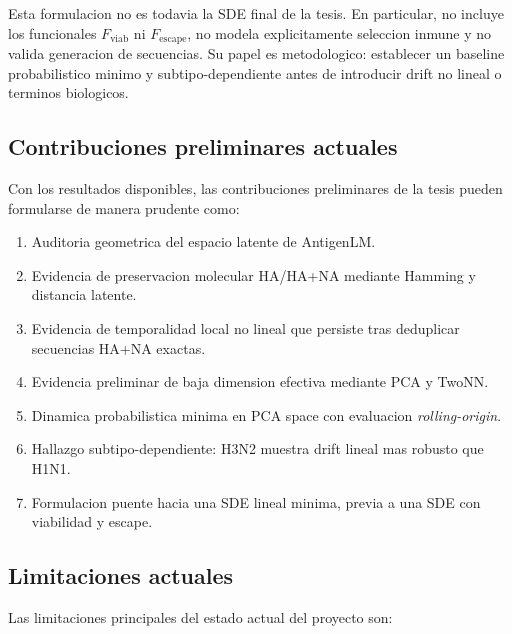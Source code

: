 \documentclass[12pt,letterpaper]{article}
\newcommand{\Fviab}{F_{\mathrm{viab}}}
\newcommand{\Fescape}{F_{\mathrm{escape}}}
\begin{document}
Esta formulacion no es todavia la SDE final de la tesis. En particular, no incluye los funcionales $\Fviab$ ni $\Fescape$, no modela explicitamente seleccion inmune y no valida generacion de secuencias. Su papel es metodologico: establecer un baseline probabilistico minimo y subtipo-dependiente antes de introducir drift no lineal o terminos biologicos.

\subsection{Contribuciones preliminares actuales}

Con los resultados disponibles, las contribuciones preliminares de la tesis pueden formularse de manera prudente como:

\begin{enumerate}[label=\textbf{C\arabic*.}, leftmargin=2.4em]
    \item Auditoria geometrica del espacio latente de AntigenLM.
    \item Evidencia de preservacion molecular HA/HA+NA mediante Hamming y distancia latente.
    \item Evidencia de temporalidad local no lineal que persiste tras deduplicar secuencias HA+NA exactas.
    \item Evidencia preliminar de baja dimension efectiva mediante PCA y TwoNN.
    \item Dinamica probabilistica minima en PCA space con evaluacion \emph{rolling-origin}.
    \item Hallazgo subtipo-dependiente: H3N2 muestra drift lineal mas robusto que H1N1.
    \item Formulacion puente hacia una SDE lineal minima, previa a una SDE con viabilidad y escape.
\end{enumerate}

\subsection{Limitaciones actuales}

Las limitaciones principales del estado actual del proyecto son:
\end{document}
